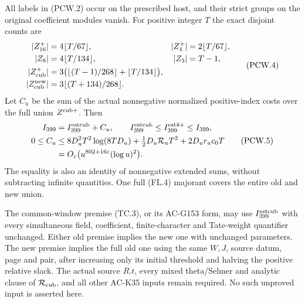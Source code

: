 \begin{theorem}
\label{AC-G155-window}
All labels in (PCW.2) occur on the prescribed host, and their
strict groups on the original coefficient modules vanish.
For positive integer $T$ the exact disjoint counts are
\[
 \begin{aligned}
 |Z_{16}^+|&=4\lfloor T/67\rfloor,&
 |Z_4^+|&=2\lfloor T/67\rfloor,\\
 |Z_8|&=4\lfloor T/134\rfloor,& |Z_3|&=T-1,\\
 |Z_{\rm cub}^+|&=3\bigl(\lfloor(T-1)/268\rfloor
                                  +\lfloor T/134\rfloor\bigr),\\
 |Z_{\rm cub}^{\rm new}|&=3\lfloor(T+134)/268\rfloor.
 \end{aligned}
 \tag{PCW.4}
\]
Let $C_u$ be the sum of the actual nonnegative normalized
positive-index costs over the full union $Z^{\rm cub+}$.  Then
\[
 \begin{aligned}
 I_{399}&=I_{399}^{\rm estcub}+C_u,\qquad
 I_{399}^{\rm estcub}\leq I_{399}^{\rm est4+}\leq I_{399},\\
 0\leq C_u&\leq8D_u^2T^2\log(8TD_u)
             +\tfrac12D_u\mathcal R_uT^2+2D_ur_uc_0T\\
 &=O_\varepsilon\bigl(u^{802+16\varepsilon}(\log u)^2\bigr).
 \end{aligned}
 \tag{PCW.5}
\]
The equality is also an identity of nonnegative extended sums,
without subtracting infinite quantities.  One full (FL.4)
majorant covers the entire old and new union.

The common-window premise (TC.3), or its AC-G153 form, may use
$I_{399}^{\rm estcub}$ with every simultaneous field, coefficient,
finite-character and Tate-weight quantifier unchanged.
Either old premise implies the new one with unchanged parameters.
The new premise implies the full old one using the same $W,J$,
source datum, page and pair, after increasing only its initial
threshold and halving the positive relative slack.
The actual source $R.t$, every mixed theta/Selmer and analytic
clause of $\mathcal R_{\rm cub}$, and all other AC-K35 inputs
remain required.  No such unproved input is asserted here.
\end{theorem}

